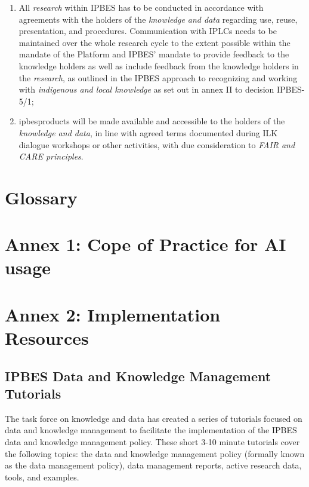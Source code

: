 \documentclass{article}
\begin{document}
\begin{enumerate}[label=(\alph*)]
    \item All \textit{research} within IPBES has to be conducted in accordance with agreements with the holders of the \textit{knowledge and data }regarding use, reuse, presentation, and procedures. Communication with IPLCs needs to be maintained over the whole research cycle to the extent possible within the mandate of the Platform and IPBES’ mandate to provide feedback to the knowledge holders as well as include feedback from the knowledge holders in the \textit{research}, as outlined in the IPBES approach to recognizing and working with \textit{indigenous and local knowledge} as set out in annex II to decision IPBES-5/1;

    \item \gls{ipbesproducts} will be made available and accessible to the holders of the \textit{knowledge and data}, in line with agreed terms documented during ILK dialogue workshops or other activities, with due consideration to \textit{FAIR and CARE principles}.
\end{enumerate}




\section{Glossary}

\printglossary

\section{Annex 1: Cope of Practice for AI usage}

\section{Annex 2: Implementation Resources}

\subsection{IPBES Data and Knowledge Management Tutorials}

The task force on knowledge and data has created a series of tutorials focused on data and knowledge management to facilitate the implementation of the IPBES data and knowledge management policy. These short 3-10 minute tutorials cover the following topics: the data and knowledge management policy (formally known as the data management policy), data management reports, active research data, tools, and examples.
\end{document}
